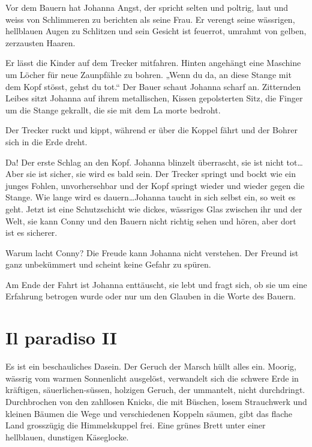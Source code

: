 \documentclass[10pt,titlepage,a5paper]{book}
\begin{document}
Vor dem Bauern hat Johanna Angst, der spricht selten und poltrig, laut und weiss von Schlimmeren zu berichten als seine Frau. Er verengt seine wässrigen, hellblauen Augen zu Schlitzen und sein Gesicht ist feuerrot, umrahmt von gelben, zerzausten Haaren.

Er lässt die Kinder auf dem Trecker mitfahren. Hinten angehängt eine Maschine um Löcher für neue Zaunpfähle zu bohren. „Wenn du da, an diese Stange mit dem Kopf stösst, gehst du tot.“ Der Bauer schaut Johanna scharf an. Zitternden Leibes sitzt Johanna auf ihrem metallischen, Kissen gepolsterten Sitz, die Finger um die Stange gekrallt, die sie mit dem La morte bedroht.

Der Trecker ruckt und kippt, während er über die Koppel fährt und der Bohrer sich in die Erde dreht.

Da! Der erste Schlag an den Kopf. Johanna blinzelt überrascht, sie ist nicht tot\dots Aber sie ist sicher, sie wird es bald sein. Der Trecker springt und bockt wie ein junges Fohlen, unvorhersehbar und der Kopf springt wieder und wieder gegen die Stange. Wie lange wird es dauern\dots Johanna taucht in sich selbst ein, so weit es geht. Jetzt ist eine Schutzschicht wie dickes, wässriges Glas zwischen ihr und der Welt, sie kann Conny und den Bauern nicht richtig sehen und hören, aber dort ist es sicherer.

Warum lacht Conny? Die Freude kann Johanna nicht verstehen. Der Freund ist ganz unbekümmert und scheint keine Gefahr zu spüren.

Am Ende der Fahrt ist Johanna enttäuscht, sie lebt und fragt sich, ob sie um eine Erfahrung betrogen wurde oder nur um den Glauben in die Worte des Bauern.



\section*{Il paradiso II}



Es ist ein beschauliches Dasein. Der Geruch der Marsch hüllt alles ein. Moorig, wässrig vom warmen Sonnenlicht ausgelöst, verwandelt sich die schwere Erde in kräftigen, säuerlichen-süssen, holzigen Geruch, der ummantelt, nicht durchdringt. Durchbrochen von den zahllosen Knicks, die mit Büschen, losem Strauchwerk und kleinen Bäumen die Wege und verschiedenen Koppeln säumen, gibt das flache Land grosszügig die Himmelskuppel frei. Eine grünes Brett unter einer hellblauen, dunstigen Käseglocke. 
\end{document}
